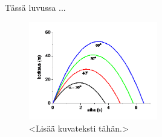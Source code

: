Tässä luvussa ...

\begin{figure}[ht!]
  \centering
  \includegraphics[width=0.5\textwidth]{assets/good-example.png}
  \caption{<Lisää kuvateksti tähän.>}
  \label{fig:good-example}
\end{figure}

\parencite{nawar_multi-heuristic_2014}

\parencite{zhang_test_2007}